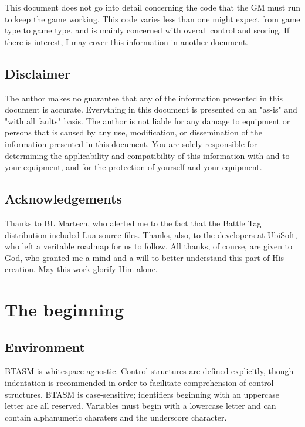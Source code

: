 \documentclass[12pt]{scrbook}
\begin{document}
This document does not go into detail concerning the code that the GM must run to keep the
game working.  This code varies less than one might expect from game type to game type, and is
mainly concerned with overall control and scoring.  If there is interest, I may cover this
information in another document. 
 
 
\section*{Disclaimer}

The author makes no
guarantee that any of the information presented in this document is accurate.  
Everything in this document is presented on an "as-is" and "with all faults" basis.  The 
author is not liable
for any damage to equipment or persons that is caused by any use, modification, or 
dissemination of the information presented in this document.  You
are solely responsible for determining the applicability and compatibility of this
information with and to your equipment, and for the protection of yourself and your 
equipment.

\section*{Acknowledgements}

Thanks to BL Martech, who alerted me to the fact that the Battle Tag distribution included
Lua source files.  Thanks, also, to the developers at UbiSoft, who left a veritable roadmap for
us to follow.  
All thanks, of course, are given to God, who granted me a mind and a will to better
understand this part of His creation.  May this work glorify Him alone.


\rohead {\thepage}
\lohead {\rightmark}
\rehead {\leftmark}
\lehead {\thepage}

\mainmatter

\chapter{The beginning}

\section{Environment}

BTASM is whitespace-agnostic.  Control structures are defined explicitly, though indentation is
recommended in order to facilitate comprehension of control structures.  BTASM is case-sensitive;
identifiers beginning with an uppercase letter are all reserved.  Variables must begin with a
lowercase letter and can contain alphanumeric charaters and the underscore character.
\end{document}

